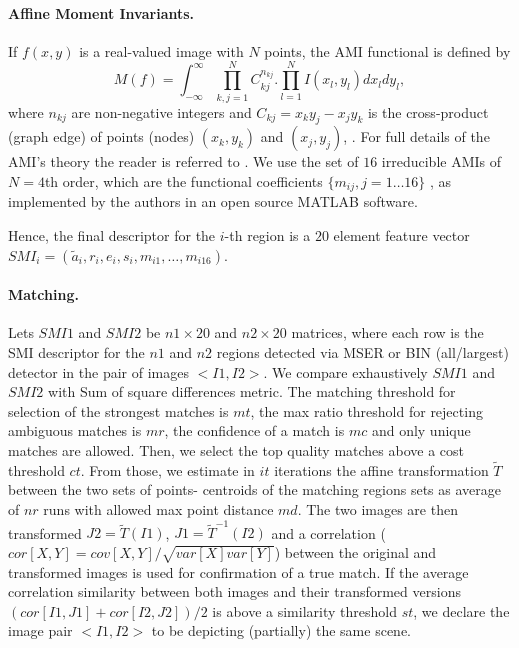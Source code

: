 \documentclass[a4paper,11pt]{article}
\begin{document}
\paragraph{Affine Moment Invariants.}
 
If $f(x,y)$ is a real-valued image with $N$ points, the AMI functional is defined by
\begin{equation}
M(f) = \int_{-\infty}^{\infty} \prod_{k,j=1}^{N}C_{kj}^{n_{kj}} . \prod_{l=1}^{N}I(x_l, y_l)dx_ldy_l,
\end{equation}
where $n_{kj}$ are non-negative integers and $C_{kj} =x_ky_j - x_jy_k$ is the cross-product (graph edge) of points (nodes) $(x_k, y_k)$ and $(x_j, y_j)$, \cite{SukF04}. For full details of the AMI's theory the reader is referred to \cite{Flusser09a}.
We use the set of $16$  irreducible AMIs of $N=4$th order, which are the functional coefficients $\{m_{ij},j=1 \ldots 16 \}$ , as implemented by the authors in an open source MATLAB software.%

Hence, the final descriptor for the $i$-th region is a $20$ element feature vector $SMI_i = (\tilde{a}_i, r_i, e_i, s_i, m_{i1}, \ldots, m_{i16})$. 

\paragraph{Matching.}

Lets $\mathit{SMI}1$ and $\mathit{SMI2}$ be $\mathit{n1} \times 20$ and $\mathit{n2} \times 20$ matrices, where each row is the SMI descriptor for the $n1$ and $n2$ regions detected via MSER or BIN (all/largest) detector in the pair of images $<I1, I2>$.
We compare exhaustively  $\mathit{SMI}1$ and $\mathit{SMI}2$ with Sum of square differences metric. The matching threshold for selection of the strongest matches is $\mathit{mt}$, the max ratio threshold for rejecting ambiguous matches is $\mathit{mr}$, the confidence of a match is $\mathit{mc}$ and only unique matches are allowed. Then, we select the top quality matches above a cost threshold $\mathit{ct}$. From those, we estimate in $\mathit{it}$ iterations the affine transformation ${\tilde T}$ between the two sets of points- centroids of the matching regions sets as average of $\mathit{nr}$ runs with allowed max point distance $\mathit{md}$. The two images are then transformed $J2 = {\tilde T}(I1)$, $J1 = {\tilde T}^{-1}(I2)$ and a correlation ($cor[X,Y] = cov[X,Y]/ \sqrt{var[X] var[Y]}$) between the original and transformed images is used for confirmation of a true match. If the average correlation similarity between both images and their transformed versions $(cor[I1, J1]+cor[I2, J2])/2$ is above a similarity threshold $st$, we declare the image pair $<I1, I2>$ to be depicting (partially) the same scene.
\end{document}
